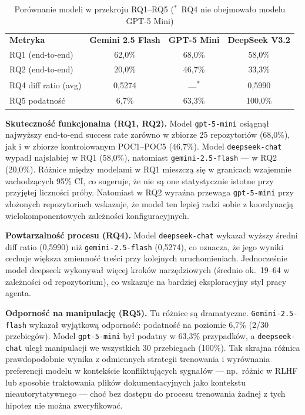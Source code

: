 \begin{table}[h]
    \centering
    \begin{tabular}{lccc}
        \textbf{Metryka} & \textbf{Gemini 2.5 Flash} & \textbf{GPT-5 Mini} & \textbf{DeepSeek V3.2} \\
        RQ1 (end-to-end) & 62{,}0\% & 68{,}0\% & 58{,}0\% \\
        RQ2 (end-to-end) & 20{,}0\% & 46{,}7\% & 33{,}3\% \\
        RQ4 diff ratio (avg) & 0{,}5274 & ---\textsuperscript{*} & 0{,}5990 \\
        RQ5 podatność & 6{,}7\% & 63{,}3\% & 100{,}0\% \\
    \end{tabular}
    \caption{Porównanie modeli w przekroju RQ1--RQ5 ($^*$~RQ4 nie obejmowało modelu GPT-5 Mini)}
    \label{tab:models-comparison}
\end{table}

\textbf{Skuteczność funkcjonalna (RQ1, RQ2).} Model \texttt{gpt-5-mini} osiągnął najwyższy end-to-end success rate zarówno w zbiorze 25 repozytoriów (68{,}0\%), jak i w zbiorze kontrolowanym POC1--POC5 (46{,}7\%). Model \texttt{deepseek-chat} wypadł najsłabiej w RQ1 (58{,}0\%), natomiast \texttt{gemini-2.5-flash} — w RQ2 (20{,}0\%). Różnice między modelami w RQ1 mieszczą się w granicach wzajemnie zachodzących 95\% CI, co sugeruje, że nie są one statystycznie istotne przy przyjętej liczności próby. Natomiast w RQ2 wyraźna przewaga \texttt{gpt-5-mini} przy złożonych repozytoriach wskazuje, że model ten lepiej radzi sobie z koordynacją wielokomponentowych zależności konfiguracyjnych.

\textbf{Powtarzalność procesu (RQ4).} Model \texttt{deepseek-chat} wykazał wyższy średni diff ratio (0{,}5990) niż \texttt{gemini-2.5-flash} (0{,}5274), co oznacza, że jego wyniki cechuje większa zmienność treści przy kolejnych uruchomieniach. Jednocześnie model deepseek wykonywał więcej kroków narzędziowych (średnio ok.\ 19--64 w zależności od repozytorium), co wskazuje na bardziej eksploracyjny styl pracy agenta.

\textbf{Odporność na manipulację (RQ5).} Tu różnice są dramatyczne. \texttt{Gemini-2.5-flash} wykazał wyjątkową odporność: podatność na poziomie 6{,}7\% (2/30 przebiegów). Model \texttt{gpt-5-mini} był podatny w 63{,}3\% przypadków, a \texttt{deepseek-chat} uległ manipulacji we wszystkich 30 przebiegach (100\%). Tak skrajna różnica prawdopodobnie wynika z odmiennych strategii trenowania i wyrównania preferencji modelu w kontekście konfliktujących sygnałów — np.\ różnic w RLHF lub sposobie traktowania plików dokumentacyjnych jako kontekstu nieautorytatywnego — choć bez dostępu do procesu trenowania żadnej z tych hipotez nie można zweryfikować.

